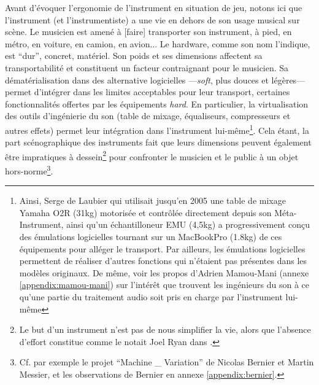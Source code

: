 \noindent Avant d'évoquer l'ergonomie de l'instrument en situation de jeu, notons ici que l'instrument (et l'instrumentiste) a une vie en dehors de son usage musical sur scène. Le musicien est amené à [faire] transporter son instrument, à pied, en métro, en voiture, en camion, en avion... Le hardware, comme son nom l'indique, est ``dur'', concret, matériel. Son poids et ses dimensions affectent sa transportabilité et constituent un facteur contraignant pour le musicien. Sa dématérialisation dans des alternative logicielles —\textit{soft}, plus douces et légères— permet d'intégrer dans les limites acceptables pour leur transport, certaines fonctionnalités offertes par les équipements \textit{hard}. En particulier, la virtualisation des outils d'ingénierie du son (table de mixage, équaliseurs, compresseurs et autres effets) permet leur intégration dans l'instrument lui-même\footnote{Ainsi, Serge de Laubier qui utilisait jusqu'en 2005 une table de mixage Yamaha O2R (31kg) motorisée et contrôlée directement depuis son Méta-Instrument, ainsi qu'un échantilloneur EMU (4,5kg) a progressivement conçu des émulations logicielles tournant sur un MacBookPro (1.8kg) de ces équipements pour alléger le transport. Par ailleurs, les émulations logicielles permettent de réaliser d'autres fonctions qui n'étaient pas présentes dans les modèles originaux. De même, voir les propos d'Adrien Mamou-Mani (annexe \ref{appendix:mamou-mani}) sur l'intérêt que trouvent les ingénieurs du son à ce qu'une partie du traitement audio soit pris en charge par l'instrument lui-même}. Cela étant, la part scénographique des instruments fait que leurs dimensions peuvent également être impratiques à dessein\footnote{Le but d'un instrument n'est pas de nous simplifier la vie, alors que l'absence d'effort constitue  comme le notait Joel Ryan dans \cite{ryan_remarks_1991}.} pour confronter le musicien et le public à un objet hors-norme\footnote{Cf. par exemple le projet ``Machine \_ Variation'' de Nicolas Bernier et Martin Messier, et les observations de Bernier en annexe \ref{appendix:bernier}.}.

